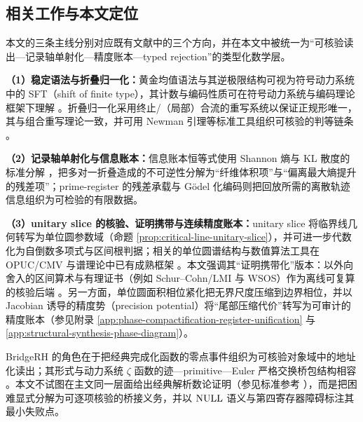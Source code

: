 \subsection{相关工作与本文定位}
本文的三条主线分别对应既有文献中的三个方向，并在本文中被统一为“可核验读出—记录轴单射化—精度账本—typed rejection”的类型化数学层。\par
\textbf{（1）稳定语法与折叠归一化：}黄金均值语法与其逆极限结构可视为符号动力系统中的 SFT（shift of finite type），其计数与编码性质可在符号动力系统与编码理论框架下理解 \cite{LindMarcus1995}。折叠归一化采用终止/（局部）合流的重写系统以保证正规形唯一，其与组合重写理论一致，并可用 Newman 引理等标准工具组织可核验的判等链条 \cite{Newman1942}。\par
\textbf{（2）记录轴单射化与信息账本：}信息账本恒等式使用 Shannon 熵与 KL 散度的标准分解 \cite{CoverThomas2006}，把多对一折叠造成的不可逆性分解为“纤维体积项”与“偏离最大熵提升的残差项”；prime-register 的残差承载与 Gödel 化编码则把回放所需的离散轨迹信息组织为可检验的有限数据。\par
\textbf{（3）unitary slice 的核验、证明携带与连续精度账本：}unitary slice 将临界线几何转写为单位圆参数域（命题 \ref{prop:critical-line-unitary-slice}），并可进一步代数化为自倒数多项式与区间根判据；相关的单位圆谱结构与数值算法工具在 OPUC/CMV 与谱理论中已有成熟框架 \cite{CanteroMoralVelazquez2003CMV,Simon2005OPUC1,BevilacquaDelCorsoGemignani2015CMVCompanion}。本文强调其“证明携带化”版本：以外向舍入的区间算术与有理证书（例如 Schur--Cohn/LMI 与 WSOS）作为离线可复算的核验后端 \cite{DaumasLesterMunoz2007,DymYoung1990SchurCohnMatrixPolynomials,DavisPapp2023}。另一方面，单位圆面积相位紧化把无界尺度压缩到边界相位，并以 Jacobian 诱导的精度势（precision potential）将“尾部压缩代价”转写为可审计的精度账本（参见附录 \ref{app:phase-compactification-register-unification} 与 \ref{app:structural-synthesis-phase-diagram}）。\par
BridgeRH 的角色在于把经典完成化函数的零点事件组织为可核验对象域中的地址化读出；其形式与动力系统 $\zeta$ 函数的迹—primitive—Euler 严格交换桥包结构相容 \cite{Ruelle1976ZetaExpanding,Ruelle1978Thermodynamic,ParryPollicott1990Zeta}。本文不试图在主文同一层面给出经典解析数论证明（参见标准参考 \cite{Apostol1976}），而是把困难显式分解为可逐项核验的桥接义务，并以 $\mathrm{NULL}$ 语义与第四寄存器障碍标注其最小失败点。

